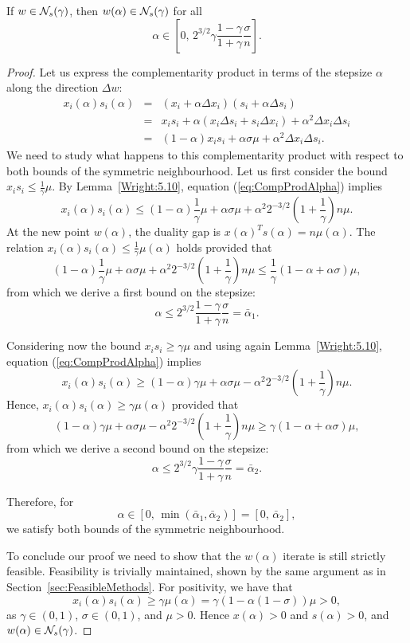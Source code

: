 \begin{theorem} \label{th:SymNeighbourhood}
If $w \in \mathcal{N}_s(\gamma)$, then $w(\alpha) \in \mathcal{N}_s(\gamma)$ for all
\[
  \alpha \in \left[0, \, 2^{3/2}\gamma\frac{1-\gamma}{1+\gamma}
                                      \frac{\sigma}{n} \right].
\]
\end{theorem}
%
\begin{proof}
Let us express the complementarity product in terms of the stepsize 
$\alpha$ along the direction $\Delta w$:
%
\begin{eqnarray} \label{eq:CompProdAlpha}
x_i(\alpha)s_i(\alpha)&=&(x_i+\alpha\Delta x_i)(s_i+\alpha\Delta s_i)\nonumber\\ 
&=& x_is_i+\alpha(x_i\Delta s_i +s_i\Delta x_i) +\alpha^2\Delta x_i\Delta s_i\\
&=& (1-\alpha)x_is_i + \alpha\sigma\mu + \alpha^2\Delta x_i\Delta s_i.\nonumber
\end{eqnarray}
%
We need to study what happens to this complementarity product 
with respect to both bounds of the symmetric neighbourhood.
Let us first consider the bound $x_is_i\le \frac{1}{\gamma}\mu$.
By Lemma~\ref{Wright:5.10}, equation (\ref{eq:CompProdAlpha}) implies
\[
x_i(\alpha)s_i(\alpha) \le (1-\alpha)\frac{1}{\gamma}\mu +\alpha\sigma\mu 
+ \alpha^2 2^{-3/2}\left( 1+ \frac{1}{\gamma} \right)n\mu.
\]
At the new point $w(\alpha)$, the duality gap
is $x(\alpha)^Ts(\alpha) = n\mu(\alpha)$.
The relation $x_i(\alpha)s_i(\alpha)\le \frac{1}{\gamma}\mu(\alpha)$ 
holds provided that
\[
(1-\alpha)\frac{1}{\gamma}\mu +\alpha\sigma\mu + \alpha^2 2^{-3/2}\left( 1+ \frac{1}{\gamma} \right)n\mu 
\le\frac{1}{\gamma}(1-\alpha+\alpha\sigma)\mu,
\]
from which we derive a first bound on the stepsize:
\[
\alpha \le 2^{3/2}\frac{1-\gamma}{1+\gamma}\frac{\sigma}{n} = \bar\alpha_1.
\]

Considering now the bound $x_is_i\ge \gamma\mu$ and using again
Lemma~\ref{Wright:5.10}, equation (\ref{eq:CompProdAlpha}) implies
\[
x_i(\alpha)s_i(\alpha) \ge (1-\alpha)\gamma\mu + \alpha\sigma\mu 
- \alpha^2 2^{-3/2}\left( 1+ \frac{1}{\gamma} \right)n\mu.
\]
Hence, $x_i(\alpha)s_i(\alpha)\ge \gamma\mu(\alpha)$ provided that
\[
(1-\alpha)\gamma\mu + \alpha\sigma\mu- \alpha^2 2^{-3/2}\left( 1+ \frac{1}{\gamma} \right)n\mu 
\ge\gamma(1-\alpha+\alpha\sigma)\mu,
\]
from which we derive a second bound on the stepsize:
\[
\alpha\le 2^{3/2}\gamma\frac{1-\gamma}{1+\gamma}\frac{\sigma}{n} =\bar\alpha_2.
\]

Therefore, for
\[
  \alpha \in [0, \, \min(\bar\alpha_1,\bar\alpha_2)] = [0, \, \bar\alpha_2],
\]
we satisfy both bounds of the symmetric neighbourhood.

To conclude our proof we need to show that the 
$w(\alpha)$ iterate is still strictly feasible.
Feasibility is trivially maintained, shown by the same argument as
in Section~\ref{sec:FeasibleMethods}.
For positivity, we have that
\[
  x_i(\alpha)s_i(\alpha) \ge \gamma \mu(\alpha) 
                         = \gamma(1 - \alpha(1-\sigma))\mu > 0,
\]
as $\gamma\in (0,1)$, $\sigma \in (0,1)$, and $\mu > 0$.
Hence $x(\alpha)>0$ and $s(\alpha)>0$, and $w(\alpha) \in \mathcal{N}_s(\gamma)$.
\end{proof}

